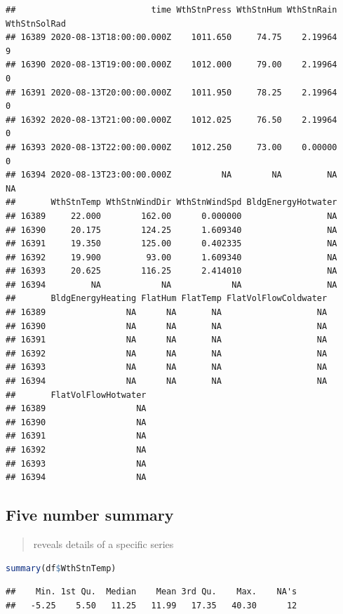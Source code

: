 \documentclass[
]{book}
\begin{document}
\begin{lstlisting}
##                           time WthStnPress WthStnHum WthStnRain WthStnSolRad
## 16389 2020-08-13T18:00:00.000Z    1011.650     74.75    2.19964            9
## 16390 2020-08-13T19:00:00.000Z    1012.000     79.00    2.19964            0
## 16391 2020-08-13T20:00:00.000Z    1011.950     78.25    2.19964            0
## 16392 2020-08-13T21:00:00.000Z    1012.025     76.50    2.19964            0
## 16393 2020-08-13T22:00:00.000Z    1012.250     73.00    0.00000            0
## 16394 2020-08-13T23:00:00.000Z          NA        NA         NA           NA
##       WthStnTemp WthStnWindDir WthStnWindSpd BldgEnergyHotwater
## 16389     22.000        162.00      0.000000                 NA
## 16390     20.175        124.25      1.609340                 NA
## 16391     19.350        125.00      0.402335                 NA
## 16392     19.900         93.00      1.609340                 NA
## 16393     20.625        116.25      2.414010                 NA
## 16394         NA            NA            NA                 NA
##       BldgEnergyHeating FlatHum FlatTemp FlatVolFlowColdwater
## 16389                NA      NA       NA                   NA
## 16390                NA      NA       NA                   NA
## 16391                NA      NA       NA                   NA
## 16392                NA      NA       NA                   NA
## 16393                NA      NA       NA                   NA
## 16394                NA      NA       NA                   NA
##       FlatVolFlowHotwater
## 16389                  NA
## 16390                  NA
## 16391                  NA
## 16392                  NA
## 16393                  NA
## 16394                  NA
\end{lstlisting}

\hypertarget{five-number-summary}{%
\subsection{Five number summary}\label{five-number-summary}}

\begin{quote}
reveals details of a specific series
\end{quote}

\begin{lstlisting}[language=R]
summary(df$WthStnTemp)
\end{lstlisting}

\begin{lstlisting}
##    Min. 1st Qu.  Median    Mean 3rd Qu.    Max.    NA's 
##   -5.25    5.50   11.25   11.99   17.35   40.30      12
\end{lstlisting}
\end{document}
